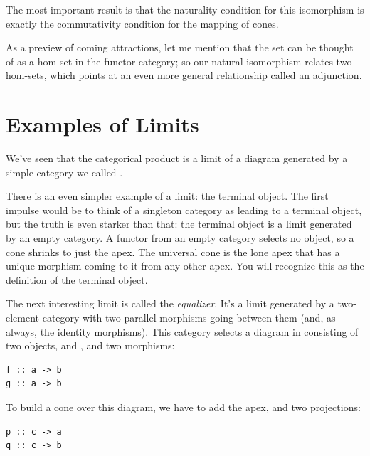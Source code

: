 The most important result is that the naturality condition for this
isomorphism is exactly the commutativity condition for the mapping of
cones.

As a preview of coming attractions, let me mention that the set
 can be thought of as a hom-set in the functor
category; so our natural isomorphism relates two hom-sets, which points
at an even more general relationship called an adjunction.

\section{Examples of Limits}\label{examples-of-limits}

We've seen that the categorical product is a limit of a diagram
generated by a simple category we called .

There is an even simpler example of a limit: the terminal object. The
first impulse would be to think of a singleton category as leading to a
terminal object, but the truth is even starker than that: the terminal
object is a limit generated by an empty category. A functor from an
empty category selects no object, so a cone shrinks to just the apex.
The universal cone is the lone apex that has a unique morphism coming to
it from any other apex. You will recognize this as the definition of the
terminal object.

The next interesting limit is called the \emph{equalizer}. It's a limit
generated by a two-element category with two parallel morphisms going
between them (and, as always, the identity morphisms). This category
selects a diagram in  consisting of two objects,  and
, and two morphisms:

\begin{verbatim}
f :: a -> b 
g :: a -> b
\end{verbatim}
To build a cone over this diagram, we have to add the apex, 
and two projections:

\begin{Verbatim}[commandchars=\\\{\}]
p :: c -> a 
q :: c -> b
\end{Verbatim}

\begin{figure}[H]
\centering
{}
\end{figure}

